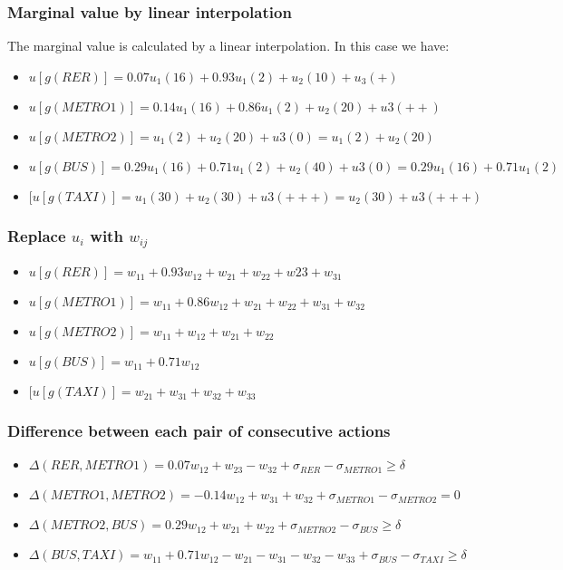 \documentclass{report}
\begin{document}
\subsubsection{Marginal value by linear interpolation}
The marginal value is calculated by a linear interpolation. In this case we have: 
\begin{itemize}
\item $u[g(RER)]= 0.07  u_1 (16) + 0.93 u_1(2)  + u_2(10) + u_3(+)$
\item $u[g(METRO1)]= 0.14  u_1 (16) + 0.86 u_1(2) + u_2(20) + u3(++)$
\item $u[g(METRO2)]= u_1 (2) + u_2(20) + u3(0) =  u_1 (2) + u_2(20) $
\item $u[g(BUS)]= 0.29  u_1 (16) + 0.71 u_1(2) + u_2(40) + u3(0) = 0.29  u_1 (16) + 0.71 u_1(2)$
\item $[u[g(TAXI)]= u_1 (30) + u_2(30) + u3(+++) = u_2(30) + u3(+++)$
\end{itemize}

\subsubsection{Replace $u_i$ with $w_{ij} $}
\begin{itemize}
\item $u[g(RER)]= w_{11} + 0.93 w_{12} + w_{21} + w_{22} + w{23} + w_{31}$
\item $u[g(METRO1)]=w_{11} + 0.86 w_{12} + w_{21} + w_{22} + w_{31} + w_{32}$
\item $u[g(METRO2)]= w_{11} + w_{12} + w_{21} + w_{22} $
\item $u[g(BUS)]= w_{11} + 0.71 w_{12}$
\item $[u[g(TAXI)]= w_{21} + w_{31} + w_{32} + w_{33}$
\end{itemize}

\subsubsection{Difference between each pair of consecutive actions}
\begin{itemize}
\item $\Delta (RER, METRO1) = 0.07 w_{12} + w_{23} - w_{32} + \sigma_{RER} - \sigma_{METRO1} \geq \delta$
\item $\Delta (METRO1, METRO2) = -0.14 w_{12} + w_{31} + w_{32} + \sigma_{METRO1}- \sigma_{METRO2} = 0$
\item $\Delta (METRO2, BUS) = 0.29 w_{12} + w_{21} + w_{22} + \sigma_{METRO2} - \sigma_{BUS} \geq \delta$
\item $\Delta (BUS, TAXI) = w_{11} + 0.71w_{12} - w_{21} - w_{31} - w_{32} - w_{33} + \sigma_{BUS} - \sigma_{TAXI} \geq \delta$
\end{itemize}
\end{document}
